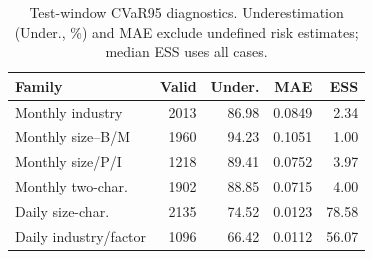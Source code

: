 \begin{table}[t]
\centering\scriptsize
\setlength{\tabcolsep}{3pt}
\caption{Test-window CVaR95 diagnostics. Underestimation (Under., \%) and MAE exclude undefined risk estimates; median ESS uses all cases.}
\label{tab:risk_family}
\begin{tabular}{lrrrr}
\toprule
Family & Valid & Under. & MAE & ESS \\
\midrule
Monthly industry & 2013 & 86.98 & 0.0849 & 2.34 \\
Monthly size--B/M & 1960 & 94.23 & 0.1051 & 1.00 \\
Monthly size/P/I & 1218 & 89.41 & 0.0752 & 3.97 \\
Monthly two-char. & 1902 & 88.85 & 0.0715 & 4.00 \\
Daily size-char. & 2135 & 74.52 & 0.0123 & 78.58 \\
Daily industry/factor & 1096 & 66.42 & 0.0112 & 56.07 \\
\bottomrule
\end{tabular}
\end{table}
